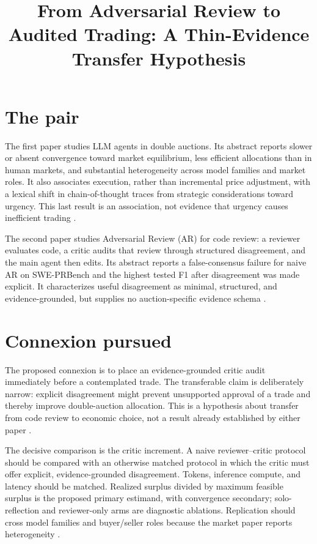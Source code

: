 \documentclass{article}
\title{From Adversarial Review to Audited Trading: A Thin-Evidence Transfer Hypothesis}
\begin{document}
\maketitle

\section{The pair}

The first paper studies LLM agents in double auctions.  Its abstract reports slower or absent convergence toward market equilibrium, less efficient allocations than in human markets, and substantial heterogeneity across model families and market roles.  It also associates execution, rather than incremental price adjustment, with a lexical shift in chain-of-thought traces from strategic considerations toward urgency.  This last result is an association, not evidence that urgency causes inefficient trading .

The second paper studies Adversarial Review (AR) for code review: a reviewer evaluates code, a critic audits that review through structured disagreement, and the main agent then edits.  Its abstract reports a false-consensus failure for naive AR on SWE-PRBench and the highest tested F1 after disagreement was made explicit.  It characterizes useful disagreement as minimal, structured, and evidence-grounded, but supplies no auction-specific evidence schema .

\section{Connexion pursued}

The proposed connexion is to place an evidence-grounded critic audit immediately before a contemplated trade.  The transferable claim is deliberately narrow: explicit disagreement might prevent unsupported approval of a trade and thereby improve double-auction allocation.  This is a hypothesis about transfer from code review to economic choice, not a result already established by either paper .

The decisive comparison is the critic increment.  A naive reviewer--critic protocol should be compared with an otherwise matched protocol in which the critic must offer explicit, evidence-grounded disagreement.  Tokens, inference compute, and latency should be matched.  Realized surplus divided by maximum feasible surplus is the proposed primary estimand, with convergence secondary; solo-reflection and reviewer-only arms are diagnostic ablations.  Replication should cross model families and buyer/seller roles because the market paper reports heterogeneity .
\end{document}
